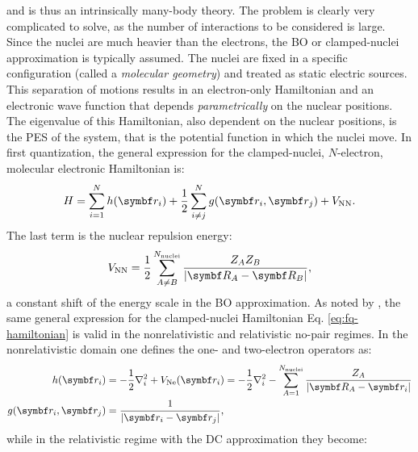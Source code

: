  and is thus an intrinsically many-body
theory. The problem is clearly very complicated to solve, as the number of
interactions to be considered is large.
Since the nuclei are much heavier than the electrons, the \gls{BO} or
clamped-nuclei approximation is typically assumed. The nuclei are fixed
in a specific configuration (called a \emph{molecular geometry}) and
treated as static electric sources.\autocite{Born1927-ce}
This separation of motions results in an electron-only Hamiltonian and
an electronic wave function that depends \emph{parametrically} on the
nuclear positions. The eigenvalue of this Hamiltonian, also dependent on
the nuclear positions, is the \gls{PES} of the system, that is the
potential function in which the nuclei move.\autocite{Szabo1989-vl,
McWeeny1992-oj}
In first quantization, the general expression for the clamped-nuclei,
$N$-electron, molecular electronic Hamiltonian is:
\begin{equation}\label{eq:fq-hamiltonian}
  H = \sum_{i=1}^N h(\vect{r}_i)
  + \frac{1}{2}\sum_{i\neq j}^N g(\vect{r}_i, \vect{r}_j)
  + V_\mathrm{NN}.
\end{equation}
The last term is the nuclear repulsion energy:
\begin{equation}
  V_\mathrm{NN} =
  \frac{1}{2}\sum_{A \neq B}^{N_\mathrm{nuclei}}\frac{Z_A
  Z_B}{|\vect{R}_A - \vect{R}_B|},
\end{equation}
a constant shift of the
energy scale in the \acrshort{BO} approximation.
As noted by \citeauthor{Saue2011-qg}, the same general expression for
the clamped-nuclei Hamiltonian Eq. \eqref{eq:fq-hamiltonian} is valid in
the nonrelativistic and relativistic no-pair
regimes.\autocite{Sucher1980-vf, Saue2011-qg}
In the nonrelativistic domain one defines the one- and two-electron
operators as:\autocite{Szabo1989-vl, McWeeny1992-oj, Konishi2009-zb}
\begin{subequations}
 \begin{align}
   h(\vect{r}_i) &=
   -\frac{1}{2}\nabla^2_i + V_\mathrm{Ne}(\vect{r}_i)
   = -\frac{1}{2}\nabla^2_i - \sum_{A=1}^{N_\mathrm{nuclei}}\frac{Z_A}{|\vect{R}_A -
   \vect{r}_i|} \label{eq:h} \\
   g(\vect{r}_i, \vect{r}_j) &= \frac{1}{|\vect{r}_i - \vect{r}_j|},
   \label{eq:g-coulomb}
 \end{align}
\end{subequations}
while in the relativistic regime with the \gls{DC}
approximation they become:\autocite{Dyall2007-tu, Konishi2009-zb, Reiher2014-cp}
